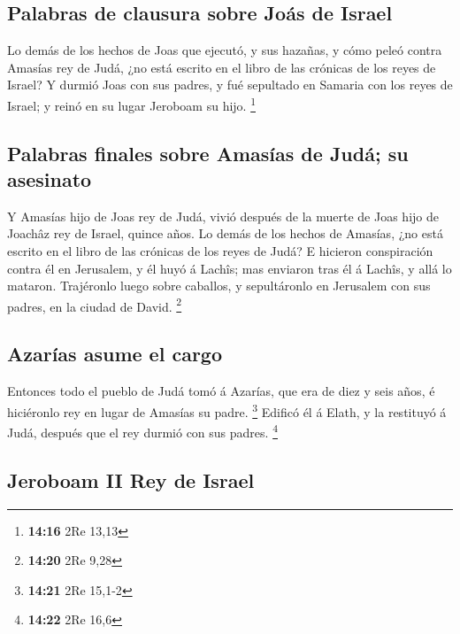 \hypertarget{palabras-de-clausura-sobre-jouxe1s-de-israel}{%
\subsection{Palabras de clausura sobre Joás de
Israel}\label{palabras-de-clausura-sobre-jouxe1s-de-israel}}

 Lo demás de los hechos de Joas que ejecutó, y sus hazañas,
y cómo peleó contra Amasías rey de Judá, ¿no está escrito en el libro de
las crónicas de los reyes de Israel?  Y durmió Joas con sus
padres, y fué sepultado en Samaria con los reyes de Israel; y reinó en
su lugar Jeroboam su hijo. \footnote{\textbf{14:16} 2Re 13,13}

\hypertarget{palabras-finales-sobre-amasuxedas-de-juduxe1-su-asesinato}{%
\subsection{Palabras finales sobre Amasías de Judá; su
asesinato}\label{palabras-finales-sobre-amasuxedas-de-juduxe1-su-asesinato}}

 Y Amasías hijo de Joas rey de Judá, vivió después de la
muerte de Joas hijo de Joachâz rey de Israel, quince años. 
Lo demás de los hechos de Amasías, ¿no está escrito en el libro de las
crónicas de los reyes de Judá?  E hicieron conspiración
contra él en Jerusalem, y él huyó á Lachîs; mas enviaron tras él á
Lachîs, y allá lo mataron.  Trajéronlo luego sobre
caballos, y sepultáronlo en Jerusalem con sus padres, en la ciudad de
David. \footnote{\textbf{14:20} 2Re 9,28}

\hypertarget{azaruxedas-asume-el-cargo}{%
\subsection{Azarías asume el cargo}\label{azaruxedas-asume-el-cargo}}

 Entonces todo el pueblo de Judá tomó á Azarías, que era de
diez y seis años, é hiciéronlo rey en lugar de Amasías su padre.
\footnote{\textbf{14:21} 2Re 15,1-2}  Edificó él á Elath, y
la restituyó á Judá, después que el rey durmió con sus padres.
\footnote{\textbf{14:22} 2Re 16,6}

\hypertarget{jeroboam-ii-rey-de-israel}{%
\subsection{Jeroboam II Rey de Israel}\label{jeroboam-ii-rey-de-israel}}

